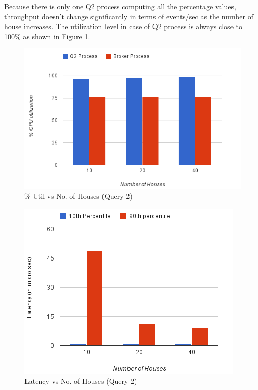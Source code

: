Because there is only one Q2 process computing all the percentage values, throughput doesn't change significantly in terms of events/sec as the number of house increases.
The utilization level in case of Q2 process is always close to 100\% as shown in Figure \ref{fig:q2_util}.

\begin{figure}[h]
\begin{center}
	\includegraphics[scale=0.55]{img/q2_utilization}
	\vspace*{-0.3cm}
	\caption{\% Util vs No.
of Houses (Query 2) \label{fig:q2_util}}
\end{center}
\end{figure}


\begin{figure}[h]
\begin{center}
	\includegraphics[scale=0.6]{img/q2_latency}
	\vspace*{-0.3cm}
	\caption{Latency vs No.
of Houses (Query 2) \label{fig:q2_latency}}
\end{center}
\end{figure}

